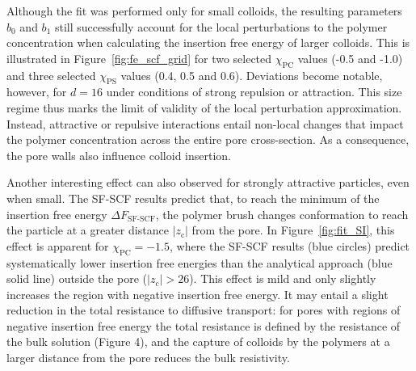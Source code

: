 \documentclass[10pt, a4paper]{article}
\begin{document}
\begin{multicols}{2}
Although the fit was performed only for small colloids, the resulting parameters $b_{0}$ and $b_{1}$ still successfully account for the local perturbations to the polymer concentration when calculating the insertion free energy of larger colloids.
This is illustrated in Figure~\ref{fig:fe_scf_grid} for two selected $\chi_{\text{PC}}$ values (-0.5 and -1.0) and three selected $\chi_{\text{PS}}$ values (0.4, 0.5 and 0.6).
Deviations become notable, however, for $d = 16$ under conditions of strong repulsion or attraction.
This size regime thus marks the limit of validity of the local perturbation approximation.
Instead, attractive or repulsive interactions entail non-local changes that impact the polymer concentration across the entire pore cross-section.
As a consequence, the pore walls also influence colloid insertion. 

Another interesting effect can also observed for strongly attractive particles, even when small.
The SF-SCF results predict that, to reach the minimum of the insertion free energy $\Delta F_{\text{SF-SCF}}$, the polymer brush changes conformation to reach the particle at a greater distance $|z_{\text{c}}|$ from the pore.
In Figure~\ref{fig:fit_SI}, this effect is apparent for $\chi_{\text{PC}} = -1.5$, where the SF-SCF results (blue circles) predict systematically lower insertion free energies than the analytical approach (blue solid line) outside the pore ($|z_{\text{c}}| > 26$).
This effect is mild and only slightly increases the region with negative insertion free energy.
It may entail a slight reduction in the total resistance to diffusive transport: for pores with regions of negative insertion free energy the total resistance is defined by the resistance of the bulk solution (Figure 4), and the capture of colloids by the polymers at a larger distance from the pore reduces the bulk resistivity.


\end{multicols}
\end{document}
